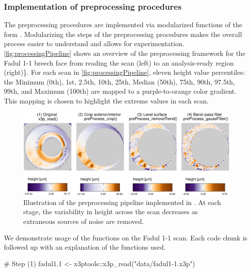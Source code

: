 \hypertarget{implementation-of-preprocessing-procedures}{%
\subsubsection{Implementation of preprocessing
procedures}\label{implementation-of-preprocessing-procedures}}

The preprocessing procedures are implemented via modularized functions
of the form . Modularizing the steps of the
preprocessing procedures makes the overall process easier to understand
and allows for experimentation. \autoref{fig:processingPipeline} shows
an overview of the preprocessing framework for the Fadul 1-1 breech face
from reading the scan (left) to an analysis-ready region (right)\}. For
each scan in \autoref{fig:processingPipeline}, eleven height value
percentiles: the Minimum (0th), 1st, 2.5th, 10th, 25th, Median (50th),
75th, 90th, 97.5th, 99th, and Maximum (100th) are mapped to a
purple-to-orange color gradient. This mapping is chosen to highlight the
extreme values in each scan.

\begin{Schunk}
\begin{figure}[htbp]

{\centering \includegraphics[width=\textwidth]{figures/cmcr-unnamed-chunk-5-1}

}

\caption{\label{fig:processingPipeline} Illustration of the  preprocessing pipeline implemented in .  At each stage, the variability in height across the scan decreases as extraneous sources of noise are removed.}\label{fig:unnamed-chunk-5}
\end{figure}
\end{Schunk}

We demonstrate usage of the  functions on the Fadul
1-1 scan. Each code chunk is followed up with an explanation of the
functions used.

\begin{Schunk}
\begin{Sinput}
# Step (1)
fadul1.1 <- x3ptools::x3p_read("data/fadul1-1.x3p")
\end{Sinput}
\end{Schunk}

